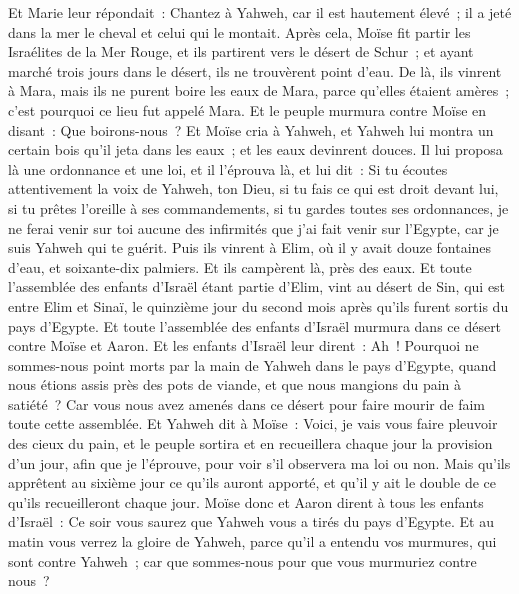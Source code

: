 \begin{multicols}{2}
Et Marie leur répondait~: Chantez à Yahweh, car il est hautement élevé~; il a jeté dans la mer le cheval et celui qui le montait.
Après cela, Moïse fit partir les Israélites de la Mer Rouge, et ils partirent vers le désert de Schur~; et ayant marché trois jours dans le désert, ils ne trouvèrent point d'eau.
De là, ils vinrent à Mara, mais ils ne purent boire les eaux de Mara, parce qu'elles étaient amères~; c'est pourquoi ce lieu fut appelé Mara.
Et le peuple murmura contre Moïse en disant~: Que boirons-nous~?
Et Moïse cria à Yahweh, et Yahweh lui montra un certain bois qu'il jeta dans les eaux~; et les eaux devinrent douces. Il lui proposa là une ordonnance et une loi, et il l'éprouva là,
et lui dit~: Si tu écoutes attentivement la voix de Yahweh, ton Dieu, si tu fais ce qui est droit devant lui, si tu prêtes l'oreille à ses commandements, si tu gardes toutes ses ordonnances, je ne ferai venir sur toi aucune des infirmités que j'ai fait venir sur l'Egypte, car je suis Yahweh qui te guérit.
Puis ils vinrent à Elim, où il y avait douze fontaines d'eau, et soixante-dix palmiers. Et ils campèrent là, près des eaux.
\VerseOne{}Et toute l'assemblée des enfants d'Israël étant partie d'Elim, vint au désert de Sin, qui est entre Elim et Sinaï, le quinzième jour du second mois après qu'ils furent sortis du pays d'Egypte.
Et toute l'assemblée des enfants d'Israël murmura dans ce désert contre Moïse et Aaron.
Et les enfants d'Israël leur dirent~: Ah~! Pourquoi ne sommes-nous point morts par la main de Yahweh dans le pays d'Egypte, quand nous étions assis près des pots de viande, et que nous mangions du pain à satiété~? Car vous nous avez amenés dans ce désert pour faire mourir de faim toute cette assemblée.
Et Yahweh dit à Moïse~: Voici, je vais vous faire pleuvoir des cieux du pain, et le peuple sortira et en recueillera chaque jour la provision d'un jour, afin que je l'éprouve, pour voir s'il observera ma loi ou non.
Mais qu'ils apprêtent au sixième jour ce qu'ils auront apporté, et qu'il y ait le double de ce qu'ils recueilleront chaque jour.
Moïse donc et Aaron dirent à tous les enfants d'Israël~: Ce soir vous saurez que Yahweh vous a tirés du pays d'Egypte.
Et au matin vous verrez la gloire de Yahweh, parce qu'il a entendu vos murmures, qui sont contre Yahweh~; car que sommes-nous pour que vous murmuriez contre nous~?

\end{multicols}
